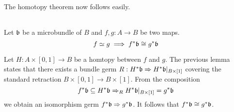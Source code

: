 \begin{file}
\begin{myparagraph}
    The homotopy theorem now follows easily.
\end{myparagraph}
\begin{mytheorem}\label{homotopy::theorem} \\
    Let $\mathfrak{b}$ be a microbundle of $B$ and $f, g: A \to B$ be two maps.
    \[ f \simeq g \implies f^*\mathfrak{b} \cong g^*\mathfrak{b} \]
\end{mytheorem}
\begin{myproof}
Let $H: A \times [0, 1] \to B$ be a homtopy between $f$ and $g$.
The previous lemma states that there exists a bundle germ $R: H^*\mathfrak{b} \Rightarrow H^*\mathfrak{b}\vert_{B \times [1]}$ covering the standard retraction $B \times [0, 1] \to B \times [1]$.
From the composition
\[ f^*\mathfrak{b} \subseteq{} H^*\mathfrak{b} \Rightarrow_R H^*\mathfrak{b}\vert_{B \times [1]} = g^*\mathfrak{b} \]
we obtain an isomorphism germ $f^*\mathfrak{b} \Rightarrow g^*\mathfrak{b}$.
It follows that $f^*\mathfrak{b} \cong g^*\mathfrak{b}$.
\end{myproof}

\end{file}